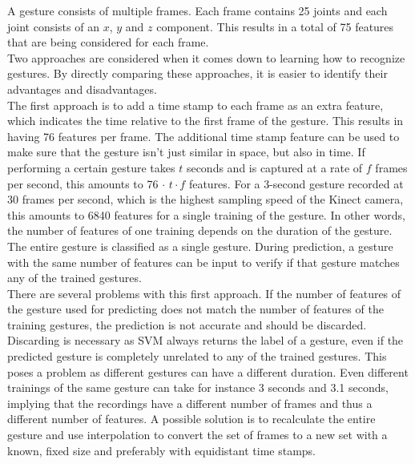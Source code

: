 A gesture consists of multiple frames. Each frame contains 25 joints and each joint consists of an $x$, $y$ and $z$ component. This results in a total of 75 features that are being considered for each frame.\\

Two approaches are considered when it comes down to learning how to recognize gestures. By directly comparing these approaches, it is easier to identify their advantages and disadvantages.\\

The first approach is to add a time stamp to each frame as an extra feature, which indicates the time relative to the first frame of the gesture. This results in having 76 features per frame. The additional time stamp feature can be used to make sure that the gesture isn't just similar in space, but also in time. If performing a certain gesture takes $t$ seconds and is captured at a rate of $f$ frames per second, this amounts to 76 $\cdot$ $t \cdot f$ features. For a 3-second gesture recorded at 30 frames per second, which is the highest sampling speed of the Kinect camera, this amounts to 6840 features for a single training of the gesture. In other words, the number of features of one training depends on the duration of the gesture. The entire gesture is classified as a single gesture. During prediction, a gesture with the same number of features can be input to verify if that gesture matches any of the trained gestures.\\

There are several problems with this first approach. If the number of features of the gesture used for predicting does not match the number of features of the training gestures, the prediction is not accurate and should be discarded. Discarding is necessary as SVM always returns the label of a gesture, even if the predicted gesture is completely unrelated to any of the trained gestures. This poses a problem as different gestures can have a different duration. Even different trainings of the same gesture can take for instance 3 seconds and 3.1 seconds, implying that the recordings have a different number of frames and thus a different number of features. A possible solution is to recalculate the entire gesture and use interpolation to convert the set of frames to a new set with a known, fixed size and preferably with equidistant time stamps.\\

